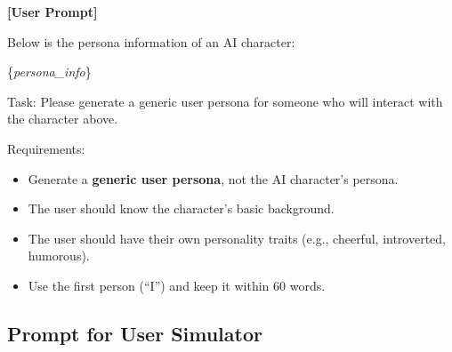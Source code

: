 \begin{tcolorbox}[
    breakable,
    colback=MyWordColor1,
    colframe=black,
    boxrule=0.6pt,
    arc=1.5mm,
    title={\textbf{Prompt for User Persona Generation}},
    fontupper=\small
]
\medskip
\textbf{[User Prompt]}

Below is the persona information of an AI character:

\medskip
\{\textit{persona\_info}\}

\medskip
Task: Please generate a generic user persona for someone who will interact with the character above.

\medskip
Requirements:
\begin{itemize}
    \item Generate a \textbf{generic user persona}, not the AI character's persona.
    \item The user should know the character's basic background.
    \item The user should have their own personality traits (e.g., cheerful, introverted, humorous).
    \item Use the first person (``I'') and keep it within 60 words.
\end{itemize}

\end{tcolorbox}

\subsection{Prompt for User Simulator}

